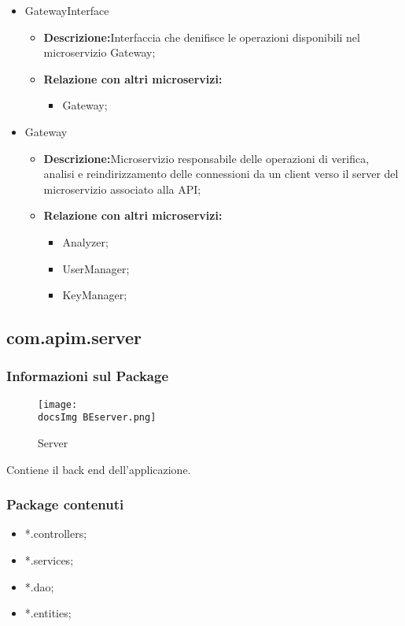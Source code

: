 {\begin{itemize}
\begin{itemize}
    \item \textbf{Relazione con altri microservizi:}
  \end{itemize}
\item GatewayInterface
  \begin{itemize}
  \item \textbf{Descrizione:}Interfaccia che denifisce le operazioni disponibili nel microservizio Gateway;
    \item \textbf{Relazione con altri microservizi:}
      \begin{itemize}
      \item Gateway;
      \end{itemize}
  \end{itemize}
\item Gateway
  \begin{itemize}
  \item \textbf{Descrizione:}Microservizio responsabile delle operazioni di verifica, analisi e reindirizzamento delle connessioni da un client verso il server del microservizio associato alla API;
    \item \textbf{Relazione con altri microservizi:}
      \begin{itemize}
      \item Analyzer;
        \item UserManager;
        \item KeyManager;
      \end{itemize}
  \end{itemize}

\end{itemize}

  \subsection{com.apim.server}{
    \subsubsection{Informazioni sul Package}
        \begin{figure}[ht]
         \centering
          \texttt{[image: \\docsImg BEserver.png]}
          \caption{Server}
          \label{Server}
        \end{figure}
        Contiene il back end dell'applicazione.
        \subsubsection{Package contenuti}
        \begin{itemize} \itemsep1pt
        \item *.controllers;
        \item *.services;
        \item *.dao;
        \item *.entities;
        \end{itemize}
  }
}

